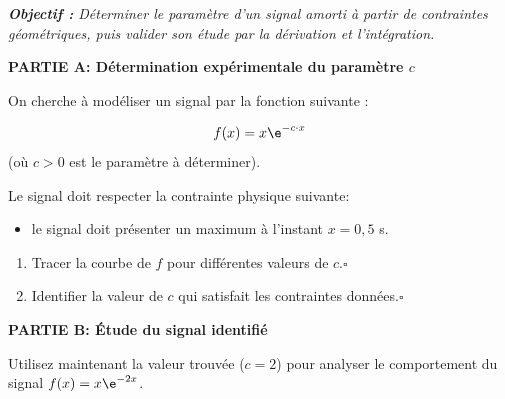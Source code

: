 \documentclass[a4paper,10pt]{report}
\begin{document}
\renewcommand{\labelitemi}{\textbullet}

\pagestyle{DS_FP}
\NomPrenomNote{}


\bigskip

\emph{\textbf{Objectif :} Déterminer le paramètre d'un signal amorti à partir de contraintes géométriques, puis valider son étude par la dérivation et l'intégration.}
\medskip

\textbf{PARTIE A: Détermination expérimentale du paramètre $c$}


\medskip

On cherche à modéliser un signal par la fonction suivante :  

\[f(x) =  x \e^{-c\cdot x}\] (où $c>0$ est le paramètre à déterminer).
\medskip

Le signal doit respecter la contrainte physique suivante:

\begin{itemize}
    \item le signal doit présenter un maximum à l'instant $x=0,5$ s.
\end{itemize}

\begin{enumerate}
    \item Tracer la courbe de $f$ pour différentes valeurs de $c$.\hfill $\square$
    \item Identifier la valeur de $c$ qui satisfait les contraintes données.\hfill $\square$
\end{enumerate}

\bigskip

\textbf{PARTIE B: Étude du signal identifié}

\medskip
Utilisez maintenant la valeur trouvée ($c = 2$) pour analyser le comportement du signal $f(x) = x \e^{-2x}$.
\end{document}
